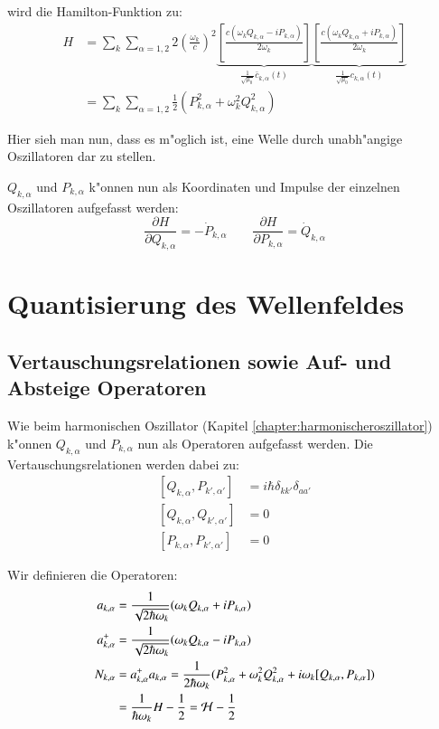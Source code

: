 wird die Hamilton-Funktion zu:
\begin{equation} \label{fq:hamilton}
\begin{split}
H &= \sum_k \sum_{\alpha=1,2} 2 \left(\frac{\omega_k}{c}\right)^2 
	\underbrace{\left[ \frac{c(\omega_k Q_{k,\alpha} - i P_{k,\alpha})}{2 \omega_k} \right]}_{\frac{1}{\sqrt{\mu_0}} \bar{c}_{k,\alpha}(t)}
	\underbrace{\left[ \frac{c(\omega_k Q_{k,\alpha} + i P_{k,\alpha})}{2 \omega_k} \right]}_{\frac{1}{\sqrt{\mu_0}} c_{k,\alpha}(t)} \\
&= \sum_k \sum_{\alpha=1,2} \frac{1}{2} (P_{k,\alpha}^2 + \omega_k^2 Q_{k,\alpha}^2)
\end{split}
\end{equation}

Hier sieh man nun, dass es m"oglich ist, eine Welle durch unabh"angige Oszillatoren dar zu stellen.

$Q_{k,\alpha}$ und $P_{k,\alpha}$ k"onnen nun als Koordinaten und Impulse der einzelnen Oszillatoren aufgefasst werden:
\begin{equation}
\dfrac{\partial H}{\partial Q_{k,\alpha}} = -\dot{P}_{k,\alpha} \qquad \dfrac{\partial H}{\partial P_{k,\alpha}} = \dot{Q}_{k,\alpha}
\end{equation}

\section{Quantisierung des Wellenfeldes}

\subsection{Vertauschungsrelationen sowie Auf- und Absteige Operatoren}
Wie beim harmonischen Oszillator (Kapitel \ref{chapter:harmonischeroszillator}) k"onnen $Q_{k,\alpha}$ und $P_{k,\alpha}$ nun als Operatoren aufgefasst werden. Die Vertauschungsrelationen werden dabei zu:
\begin{equation}
\begin{split}
[Q_{k,\alpha}, P_{k',\alpha'}] &= i \hbar \delta_{kk'}\delta_{aa'} \\
[Q_{k,\alpha}, Q_{k',\alpha'}] &= 0 \\
[P_{k,\alpha}, P_{k',\alpha'}] &= 0
\end{split}
\end{equation}

Wir definieren die Operatoren:
\begin{equation}
\begin{split}
a_{k,\alpha} &= \frac{1}{\sqrt{2 \hbar \omega_k}} (\omega_k Q_{k,\alpha} + iP_{k,\alpha}) \\
a^+_{k,\alpha} &= \frac{1}{\sqrt{2 \hbar \omega_k}} (\omega_k Q_{k,\alpha} - iP_{k,\alpha})\\
N_{k,\alpha} &= a^+_{k,\alpha} a_{k,\alpha} = \frac{1}{2 \hbar \omega_k} (P_{k,\alpha}^2 + \omega_k^2 Q_{k,\alpha}^2 + i\omega_k [Q_{k,\alpha},P_{k,\alpha}] ) \\
 &= \frac{1}{ \hbar \omega_k } H - \frac{1}{2} = {\cal H} - \frac{1}{2}
\end{split}
\end{equation}


